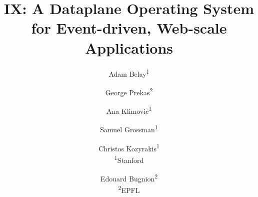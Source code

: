 \documentclass[10pt,twocolumn]{article}
\newif\ifcomments
\begin{document}
\title{\bf IX: A Dataplane Operating System for \break Event-driven, Web-scale Applications}

\author{Adam Belay\textsuperscript{1} \and 
  George Prekas\textsuperscript{2} \and 
  Ana Klimovic\textsuperscript{1} \and 
  Samuel Grossman\textsuperscript{1} \and
  Christos Kozyrakis\textsuperscript{1}\\\textsuperscript{1}Stanford \and
  Edouard Bugnion\textsuperscript{2}\\\textsuperscript{2}EPFL}

 

\date{}
\maketitle
\thispagestyle{empty}














 

%

\end{document}
